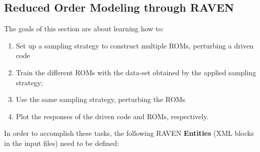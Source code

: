 \subsection{Reduced Order Modeling through RAVEN}
\label{subsub:ROMraven}
The goals of this section are about learning how to:
 \begin{enumerate}
   \item Set up a sampling strategy to construct multiple ROMs, perturbing a driven code
   \item Train the different ROMs with the data-set obtained by the applied sampling strategy;
   \item Use the same sampling strategy, perturbing the ROMs
   \item Plot the responses of the driven code and ROMs, respectively.
\end{enumerate}  
In order to accomplish these tasks, the following RAVEN \textbf{Entities} (XML blocks in the input files) need to be defined:
